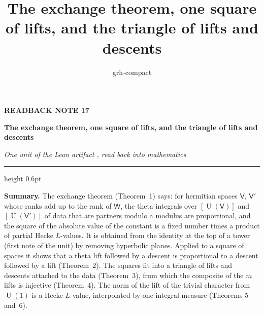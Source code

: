 \documentclass[11pt,a4paper]{article}
\title{The exchange theorem, one square of lifts, and the triangle of lifts and descents}
\author{grh-compact}
\date{}
\theoremstyle{plainx}
\theoremstyle{uprightx}
\newcommand{\sW}{\mathsf{W}}
\newcommand{\sV}{\mathsf{V}}
\newcommand{\U}{\operatorname{U}}
\begin{document}
\color{ink}

{\raggedright
{\sffamily\bfseries\fontsize{7.2}{9}\selectfont\color{leancol}READBACK NOTE 17\par}
\vspace{5pt}
{\fontsize{21.5}{25.5}\selectfont\bfseries The exchange theorem, one square of lifts, and the triangle of lifts and
descents\par}
\vspace{5pt}
{\fontsize{12.4}{16}\selectfont\itshape\color{inksoft} One unit of the Lean artifact \ArtifactName, read back into
mathematics\par}}
\vspace{8pt}
{\color{rulegrey}\hrule height 0.6pt}
\vspace{7pt}
\thispagestyle{empty}

\textbf{Summary.} The exchange theorem (Theorem~1) says: for hermitian spaces $\sV$, $\sV'$ whose ranks add up to
the rank of $\sW$, the theta integrals over $[\U(\sV)]$ and $[\U(\sV')]$ of data that are partners modulo a
modulus are proportional, and the square of the absolute value of the constant is a fixed number times a product
of partial Hecke $L$-values. It is obtained from the identity at the top of a tower (first note of the unit) by
removing hyperbolic planes. Applied to a square of spaces it shows that a theta lift followed by a descent is
proportional to a descent followed by a lift (Theorem~2). The squares fit into a triangle of lifts and descents
attached to the data (Theorem~3), from which the composite of the $m$ lifts is injective (Theorem~4). The norm of
the lift of the trivial character from $\U(1)$ is a Hecke $L$-value, interpolated by one integral measure
(Theorems 5 and~6).
\end{document}
